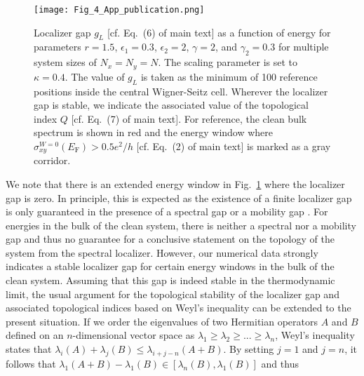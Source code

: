 \documentclass[aps,prb,amsmath,amssymb,twocolumn, superscriptaddress]{revtex4-2}
\begin{document}
\begin{figure}[htp]	 
\texttt{[image: Fig\_4\_App\_publication.png]}
\caption{Localizer gap $g_L$ [cf. Eq.~(6) of main text] as a function of energy for parameters $r = 1.5$, $\epsilon_1 = 0.3$, $\epsilon_2 = 2$, $\gamma  =2$, and $\gamma_2 = 0.3$ for multiple 
system sizes of $N_x = N_y = N$. The scaling parameter is set to $\kappa = 0.4$. The value of $g_L$ is taken as the minimum of 100 reference positions inside the central Wigner-Seitz cell. Wherever the localizer gap is stable, we indicate the associated value of the topological index $Q$ [cf. Eq.~(7) of main text]. For reference, the clean bulk spectrum is shown in red and the energy window where $\sigma_{xy}^{W=0}(E_\mathrm{F})  > 0.5 e^2 / h$ [cf. Eq.~(2) of main text] is marked as a gray corridor. }\label{Fig:Spec_Loc_Data_size}
\end{figure}

We note that there is an extended energy window in Fig.~\ref{Fig:Spec_Loc_Data_size} where the localizer gap is zero. In principle, this is expected as the existence of a finite localizer gap is only guaranteed in the presence of a spectral gap \cite{Spec_loc_5_App} or a mobility gap \cite{spec_loc_mobility_gap_App}. For energies in the bulk of the clean system, there is neither a spectral nor a mobility gap and thus no guarantee for a conclusive statement on the topology of the system from the spectral localizer. However, our numerical data strongly indicates a stable localizer gap for certain energy windows in the bulk of the clean system. Assuming that this gap is indeed stable in the thermodynamic limit, the usual argument for the topological stability of the localizer gap and associated topological indices based on Weyl's inequality \cite{Spec_loc_5_App, Fine_structure_App} can be extended to the present situation. If we order the eigenvalues of two Hermitian operators $A$ and $B$ defined on an $n$-dimensional vector space as $\lambda_1  \geq \lambda_2 \geq ... \geq \lambda_n$, Weyl's inequality states that $\lambda_i(A) + \lambda_j(B) \leq  \lambda_{i + j - n}(A + B)$. By setting $j=1$ and $j=n$, it follows that $\lambda_1(A + B) - \lambda_1(B) \in [\lambda_n(B), \lambda_1(B)]$ and thus 
\end{document}
